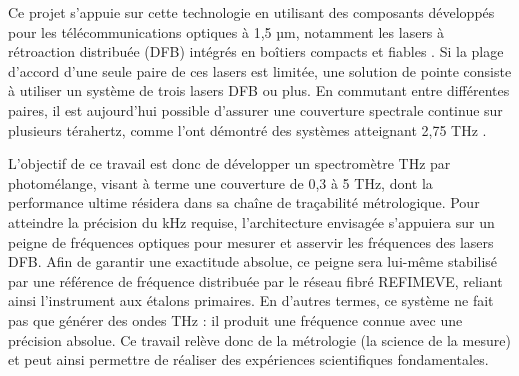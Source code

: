 Ce projet s'appuie sur cette technologie en utilisant des composants développés pour les télécommunications optiques à 1,5 µm, notamment les lasers à rétroaction distribuée (DFB) intégrés en boîtiers compacts et fiables \cite{Stanze2010}. Si la plage d'accord d'une seule paire de ces lasers est limitée, une solution de pointe consiste à utiliser un système de trois lasers DFB ou plus. En commutant entre différentes paires, il est aujourd'hui possible d'assurer une couverture spectrale continue sur plusieurs térahertz, comme l'ont démontré des systèmes atteignant 2,75 THz \cite{Deninger2015}.

L'objectif de ce travail est donc de développer un spectromètre THz par photomélange, visant à terme une couverture de 0,3 à 5 THz, dont la performance ultime résidera dans sa chaîne de traçabilité métrologique. Pour atteindre la précision du kHz requise, l'architecture envisagée s'appuiera sur un peigne de fréquences optiques pour mesurer et asservir les fréquences des lasers DFB. Afin de garantir une exactitude absolue, ce peigne sera lui-même stabilisé par une référence de fréquence distribuée par le réseau fibré REFIMEVE, reliant ainsi l'instrument aux étalons primaires. En d'autres termes, ce système ne fait pas que générer des ondes THz : il produit une fréquence connue avec une précision absolue. Ce travail relève donc de la métrologie (la science de la mesure) et peut ainsi permettre de réaliser des expériences scientifiques fondamentales. 







